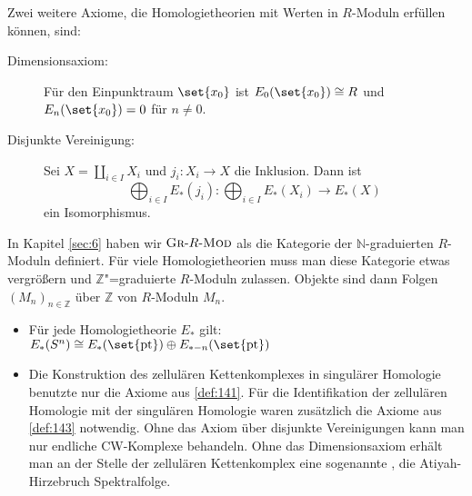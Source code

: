 \begin{definition}[{name=[{Dimensionsaxiom und Axiom über disjunkte Vereinigungen}]},label=def:143]
	Zwei weitere Axiome, die Homologietheorien mit Werten in $R$-Moduln erfüllen können, sind:
	\begin{description}
		\item[Dimensionsaxiom:] Für den Einpunktraum $\set{x_0}$ ist $E_0(\set{x_0})\cong R$ und $E_n(\set{x_0})=0$ für $n \not=0$.
		\item[Disjunkte Vereinigung:]  Sei $X = \coprod_{i \in I} X_i$ und $j_i \colon X_i \to X$ die Inklusion. Dann ist 
		\[
			\bigoplus_{i \in I} E_*(j_i) \colon \bigoplus_{i \in I} E_*(X_i) \longrightarrow E_*(X)
		\]
		ein Isomorphismus.
	\end{description}
\end{definition}

\begin{bemerkung}[{name=[{über Z-graduierte Moduln}]}]
	In Kapitel \ref{sec:6} haben wir $\textsc{Gr}\text{-}R\text{-}\textsc{Mod}$ als die Kategorie der $\mathbb{N}$-graduierten $R$-Moduln definiert. 
	Für viele Homologietheorien muss man diese Kategorie etwas vergrößern und $\mathbb{Z}$"=graduierte $R$-Moduln zulassen. 
	Objekte sind dann Folgen $(M_n)_{n \in \mathbb{Z}}$ über $\mathbb{Z}$ von $R$-Moduln $M_n$.
\end{bemerkung}

\begin{bemerkung}[{name=[{Homologie der Sphäre und zur zellulären Homologie}]}]
	\leavevmode
	\begin{itemize}
		\item Für jede Homologietheorie $E_*$ gilt: 
		\(
			E_*(S^n) \cong E_* \enbrace*{\set{\mathrm{pt}}} \oplus E_{*-n} \enbrace*{\set{\mathrm{pt}} }  
		\)
		\item Die Konstruktion des zellulären Kettenkomplexes in singulärer Homologie benutzte nur die Axiome aus \autoref{def:141}. 
		Für die Identifikation der zellulären Homologie mit der singulären Homologie waren zusätzlich die Axiome aus \autoref{def:143} notwendig. 
		Ohne das Axiom über disjunkte Vereinigungen kann man nur endliche CW-Komplexe behandeln.
		Ohne das Dimensionsaxiom erhält man an der Stelle der zellulären Kettenkomplex eine sogenannte , die Atiyah-Hirzebruch Spektralfolge. 
	\end{itemize}
\end{bemerkung}


